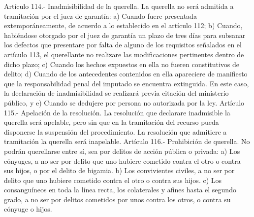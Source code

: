     Artículo 114.- Inadmisibilidad de la querella. La querella no será admitida a tramitación por el juez de garantía:
    a) Cuando fuere presentada extemporáneamente, de acuerdo a lo establecido en el artículo 112;
    b) Cuando, habiéndose otorgado por el juez de garantía un plazo de tres días para subsanar los defectos que presentare por falta de alguno de los requisitos señalados en el artículo 113, el querellante no realizare las modificaciones pertinentes dentro de dicho plazo;
    c) Cuando los hechos expuestos en ella no fueren constitutivos de delito;
    d) Cuando de los antecedentes contenidos en ella apareciere de manifiesto que la responsabilidad penal del imputado se encuentra extinguida. En este caso, la declaración de inadmisibilidad se realizará previa citación del ministerio público, y
    e) Cuando se dedujere por persona no autorizada por la ley.
    Artículo 115.- Apelación de la resolución. La resolución que declarare inadmisible la querella será apelable, pero sin que en la tramitación del recurso pueda disponerse la suspensión del procedimiento.
    La resolución que admitiere a tramitación la querella será inapelable.
    Artículo 116.- Prohibición de querella. No podrán querellarse entre sí, sea por delitos de acción pública o privada:
    a) Los cónyuges, a no ser por delito que uno hubiere cometido contra el otro o contra sus hijos, o por el delito de bigamia.
    b) Los convivientes civiles, a no ser por delito que uno hubiere cometido contra el otro o contra sus hijos.
    c) Los consanguíneos en toda la línea recta, los colaterales y afines hasta el segundo grado, a no ser por delitos cometidos por unos contra los otros, o contra su cónyuge o hijos.

